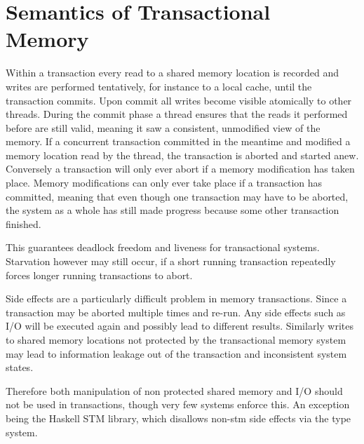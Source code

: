 \section{Semantics of Transactional Memory}

\label{sec:stm-semantics}

Within a transaction every read to a shared memory location is recorded and
writes are performed tentatively, for instance to a local cache, until the
transaction commits. Upon commit all writes become visible atomically to other
threads. During the commit phase a thread ensures that the reads it performed
before are still valid, meaning it saw a consistent, unmodified view of the
memory. If a concurrent transaction committed in the meantime and modified a
memory location read by the thread, the transaction is aborted and started anew.
Conversely a transaction will only ever abort if a memory modification has taken
place. Memory modifications can only ever take place if a transaction has
committed, meaning that even though one transaction may have to be aborted, the
system as a whole has still made progress because some other transaction
finished.

This guarantees deadlock freedom and liveness for transactional systems.
Starvation however may still occur, if a short running transaction repeatedly
forces longer running transactions to abort.

Side effects are a particularly difficult problem in memory transactions. Since
a transaction may be aborted multiple times and re-run. Any side effects such as
I/O will be executed again and possibly lead to different results. Similarly
writes to shared memory locations not protected by the transactional memory
system may lead to information leakage out of the transaction and inconsistent
system states.

Therefore both manipulation of non protected shared memory and I/O should not be
used in transactions, though very few systems enforce this. An exception being
the Haskell STM library, which disallows non-stm side effects via the type system.
